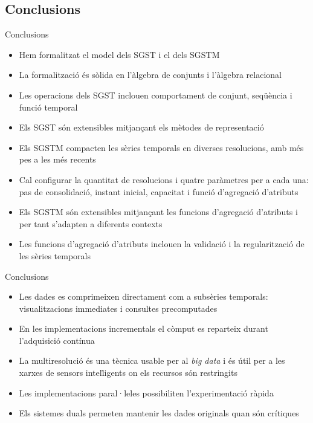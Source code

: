 \subsection*{Conclusions}
\begin{frame}{Conclusions}

  \begin{itemize}
  \item Hem formalitzat el model dels SGST i el dels SGSTM
  \item La formalització és sòlida en l’àlgebra de conjunts i l’àlgebra relacional

  \item Les operacions dels SGST inclouen comportament de conjunt,
    seqüència i funció temporal
\item Els SGST són extensibles mitjançant els mètodes de representació
\item Els SGSTM compacten les sèries temporals en diverses resolucions, amb més pes a les més recents
\item Cal configurar la quantitat de resolucions i quatre paràmetres per a cada una: pas de consolidació, instant inicial, capacitat i funció d’agregació d’atributs
\item Els SGSTM són extensibles mitjançant les funcions d’agregació d’atributs i per tant s’adapten a diferents contexts
\item Les funcions d’agregació d’atributs inclouen la validació i la regularització de les sèries temporals

  \end{itemize}


\end{frame}

\begin{frame}{Conclusions}
  \begin{itemize}
\item Les dades es comprimeixen directament com a subsèries temporals: visualitzacions immediates i consultes precomputades
\item En les implementacions incrementals el còmput es reparteix durant l’adquisició contínua
\item La multiresolució és una tècnica usable per al \emph{big data} i és útil per a les xarxes de sensors intel\.ligents on els recursos són restringits
\item Les implementacions paral·leles possibiliten l’experimentació ràpida
\item Els sistemes duals permeten mantenir les dades originals quan són crítiques
  \end{itemize}
\end{frame}


